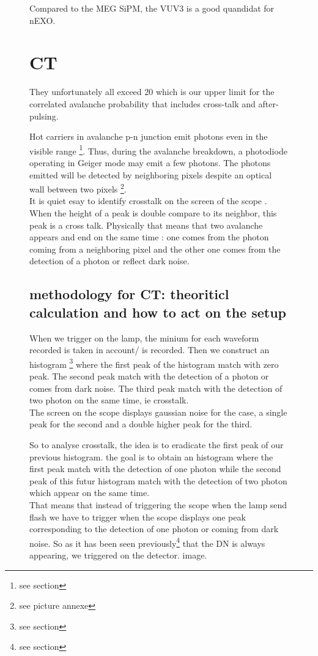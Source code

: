 \documentclass[a4paper, 11pt]{report}%
\begin{document}
\begin{figure}[!hbtp]
  
  Compared to the MEG SiPM, the VUV3 is a good quandidat for nEXO.  
  
  \section{CT}
  
  They unfortunately all exceed 20%
  which is our upper limit for the correlated avalanche probability that includes cross-talk and after-pulsing.
  
  Hot carriers in avalanche p-n junction emit photons even in the visible range \footnote{see section}. Thus, 
  during the avalanche breakdown, a photodiode operating in Geiger mode may emit a few photons. 
  The photons emitted will be detected by neighboring pixels despite an optical wall between two pixels \footnote{see picture annexe}. 
  \\
  
  It is quiet esay to identify crosstalk on the screen of the scope . 
  When the height of a peak is double compare to its neighbor, this peak is a cross talk. Physically that means that two avalanche appears and end 
  on the same time : one comes from the photon coming from a neighboring pixel and the other one comes from the detection of a photon or 
  reflect dark noise. 
  
  \subsection{methodology for CT: theoriticl calculation and how to act on the setup}
  
  When we trigger on the lamp, the minium for each waveform recorded is taken in account/ is recorded. Then we construct an histogram 
  \footnote{see section} where the first peak of the histogram match with zero peak. The second peak match with the detection of a photon or 
  comes from dark noise. The third peak match with the detection of two photon on the same time, ie crosstalk.\\
  The screen on the scope displays gaussian noise for the case, a single peak for the second and a double higher peak for the third. 
  
  So to analyse crosstalk, the idea is to eradicate the first peak of our previous histogram. the goal
  is to obtain an histogram where the first peak match with the detection of 
  one photon while the second peak of this futur histogram match with the detection of two photon which appear on the 
  same time.\\
  That means that instead of triggering the scope when the lamp send flash we have to trigger when the scope displays
  one peak corresponding to the detection of one photon or coming from dark noise. 
  So as it has been seen previously\footnote{see section} that the DN is always appearing, we triggered on the detector. 
  image. 
  

\end{figure}
\end{document}

